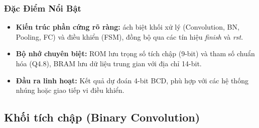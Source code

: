 \subsubsection{Đặc Điểm Nổi Bật}
\begin{itemize}
    \item \textbf{Kiến trúc phần cứng rõ ràng:} ách biệt khối xử lý (Convolution, BN, Pooling, FC) và điều khiển (FSM), đồng bộ qua các tín hiệu \textit{finish} và \textit{rst}.
    \item \textbf{Bộ nhớ chuyên biệt:} ROM lưu trọng số tích chập (9-bit) và tham số chuẩn hóa (Q4.8), BRAM lưu dữ liệu trung gian với địa chỉ 14-bit.
    \item \textbf{Đầu ra linh hoạt:} Kết quả dự đoán 4-bit BCD, phù hợp với các hệ thống nhúng hoặc giao tiếp vi điều khiển.
\end{itemize}

\subsection{Khối tích chập (Binary Convolution)}
